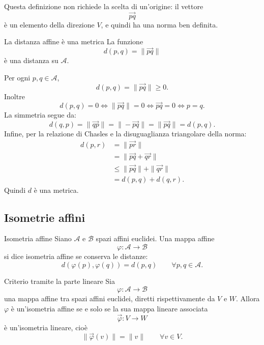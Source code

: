 \documentclass[a4paper]{article}
\begin{document}
Questa definizione non richiede la scelta di un'origine: il vettore
\[
    \overrightarrow{pq}
\]
è un elemento della direzione \(V\), e quindi ha una norma ben definita.

\begin{snippetproposition}{La distanza affine è una metrica}
    La funzione
    \[
        d(p,q)=\|\overrightarrow{pq}\|
    \]
    è una distanza su \(\mathcal{A}\).
\end{snippetproposition}

\begin{snippetproof}{}
    Per ogni \(p,q\in\mathcal{A}\),
    \[
        d(p,q)=\|\overrightarrow{pq}\|\geq 0.
    \]
    Inoltre
    \[
        d(p,q)=0
        \Longleftrightarrow
        \|\overrightarrow{pq}\|=0
        \Longleftrightarrow
        \overrightarrow{pq}=0
        \Longleftrightarrow
        p=q.
    \]
    La simmetria segue da:
    \[
        d(q,p)=\|\overrightarrow{qp}\|
        =
        \|-\overrightarrow{pq}\|
        =
        \|\overrightarrow{pq}\|
        =
        d(p,q).
    \]
    Infine, per la relazione di Chasles e la disuguaglianza triangolare della norma:
    \begin{align*}
        d(p,r)
        &=
        \|\overrightarrow{pr}\|\\
        &=
        \|\overrightarrow{pq}+\overrightarrow{qr}\|\\
        &\leq
        \|\overrightarrow{pq}\|+\|\overrightarrow{qr}\|\\
        &=
        d(p,q)+d(q,r).
    \end{align*}
    Quindi \(d\) è una metrica.
\end{snippetproof}

\subsection{Isometrie affini}

\begin{snippetdefinition}{Isometria affine}
    Siano \(\mathcal{A}\) e \(\mathcal{B}\) spazi affini euclidei. Una mappa affine
    \[
        \varphi:\mathcal{A}\to\mathcal{B}
    \]
    si dice isometria affine se conserva le distanze:
    \[
        d(\varphi(p),\varphi(q))=d(p,q)
        \qquad
        \forall p,q\in\mathcal{A}.
    \]
\end{snippetdefinition}

\begin{snippetproposition}{Criterio tramite la parte lineare}
    Sia
    \[
        \varphi:\mathcal{A}\to\mathcal{B}
    \]
    una mappa affine tra spazi affini euclidei, diretti rispettivamente da \(V\) e \(W\). Allora \(\varphi\) è un'isometria affine se e solo se la sua mappa lineare associata
    \[
        \overrightarrow{\varphi}:V\to W
    \]
    è un'isometria lineare, cioè
    \[
        \|\overrightarrow{\varphi}(v)\|=\|v\|
        \qquad
        \forall v\in V.
    \]
\end{snippetproposition}
\end{document}
